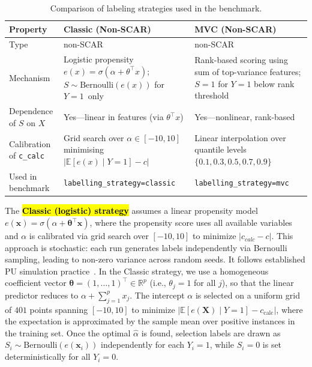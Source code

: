 \documentclass[applsci,article,accept,pdftex,moreauthors]{Definitions/mdpi}
\begin{document}
\begin{table}[H]
\caption{Comparison of labeling strategies used in the benchmark.}
\label{tab:labelling_strategies}
\small
\begin{tabularx}{\textwidth}{l >{\raggedright\arraybackslash}X >{\raggedright\arraybackslash}X}
\toprule
\textbf{Property} & \textbf{Classic (Non-SCAR)} & \textbf{MVC (Non-SCAR)} \\
\midrule
Type & non-SCAR & non-SCAR \\
\midrule
Mechanism & Logistic propensity $e(x) = \sigma(\alpha + \theta^\top x)$; $S \sim \mathrm{Bernoulli}(e(x))$ for \mbox{$Y=1$ only} & Rank-based scoring using sum of top-variance features; $S=1$ for $Y=1$ below rank threshold \\
\midrule
Dependence of $S$ on $X$ & Yes---linear in features (via $\theta^\top x$) & Yes---nonlinear, rank-based \\
\midrule
Calibration of \texttt{c\_calc} & Grid search over $\alpha \in [-10, 10]$ minimising $\bigl|\mathbb{E}[e(x) \mid Y=1] - c\bigr|$ & Linear interpolation over quantile levels $\{0.1, 0.3, 0.5, 0.7, 0.9\}$ \\
\midrule
Used in benchmark & \texttt{labelling\_strategy=classic} & \texttt{labelling\_strategy=mvc} \\
\bottomrule
\end{tabularx}
\end{table}
The \textbf{\hl{Classic (logistic) strategy}} assumes a linear propensity model $e(\mathbf{x}) = \sigma(\alpha + \boldsymbol{\theta}^\top \mathbf{x})$, where the propensity score uses all available variables and $\alpha$ is calibrated via grid search over $[-10, 10]$ to minimize $|c_{calc} - c|$. This approach is stochastic: each run generates labels independently via Bernoulli sampling, leading to non-zero variance across random seeds. It follows established PU simulation practice~\cite{pu_classic_propensity}. In the Classic strategy, we use a homogeneous coefficient vector $\boldsymbol{\theta} = (1, \dots, 1)^\top \in \mathbb{R}^p$ (i.e., $\theta_j = 1$ for all $j$), so that the linear predictor reduces to $\alpha + \sum_{j=1}^p x_j$. The intercept $\alpha$ is selected on a uniform grid of $401$ points spanning $[-10, 10]$ to minimize $\bigl|\mathbb{E}[e(\mathbf{X})\mid Y=1] - c_{\mathrm{calc}}\bigr|$, where the expectation is approximated by the sample mean over positive instances in the training set. Once the optimal $\hat{\alpha}$ is found, selection labels are drawn as $S_i \sim \mathrm{Bernoulli}(e(\mathbf{x}_i))$ independently for each $Y_i = 1$, while $S_i = 0$ is set deterministically for all $Y_i = 0$.
\end{document}
